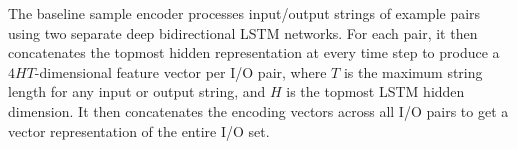 \documentclass{article}
\begin{document}
The baseline sample encoder processes input/output strings of example pairs
using two separate deep bidirectional LSTM networks.
For each pair, it then concatenates the topmost hidden representation
at every time step to produce a $4HT$-dimensional feature vector per I/O pair,
where $T$ is the maximum string length for any input or output string,
and $H$ is the topmost LSTM hidden dimension.
It then concatenates the encoding vectors across all I/O pairs
to get a vector representation of the entire I/O set.~\citep{nsps}

\end{document}
